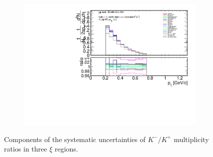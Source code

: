\begin{figure}[h!]
\begin{subfigure}{.49\textwidth}
		\end{subfigure}
		\begin{subfigure}{.49\textwidth}
			\includegraphics[width=\textwidth,page=24]{chapters/chrgSTAR/img/syst/outPID_SDT.pdf}
		\end{subfigure}
		\begin{minipage}{.49\textwidth}
			\caption{Components of the systematic uncertainties of $K^-/K^+$ multiplicity ratios  in three $\xi$ regions. }
			\label{fig:results_star_syst_K}
		\end{minipage}
		
\end{figure}

